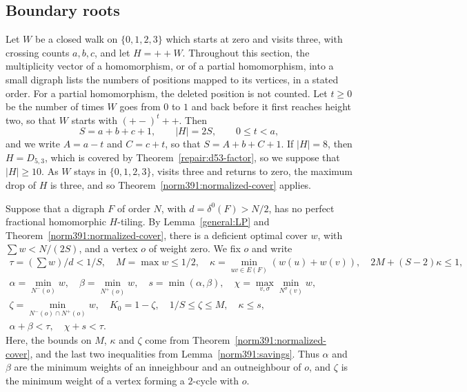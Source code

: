 \subsection{Boundary roots}
\label{boundary391:section}
Let $W$ be a closed walk on $\{0,1,2,3\}$ which starts at zero and visits
three, with crossing counts $a,b,c$, and let $H=++W$.
Throughout this section, the multiplicity vector of a homomorphism, or of a partial homomorphism, into a small digraph lists the numbers of positions mapped to its vertices, in a stated order. For a partial homomorphism, the deleted position is not counted.
Let $t\ge0$ be the number of times $W$ goes from $0$ to $1$ and back before it first reaches height two, so that $W$ starts with $(+-)^t++$. Then
\begin{equation}\label{tworoots:parameters}
 S=a+b+c+1,\qquad |H|=2S,\qquad 0\le t<a,
\end{equation}
and we write $A=a-t$ and $C=c+t$, so that $S=A+b+C+1$.
If $|H|=8$, then $H=D_{5,3}$, which is covered by Theorem~\ref{repair:d53-factor}, so we suppose that $|H|\ge10$. As $W$ stays in $\{0,1,2,3\}$, visits three and returns to zero, the maximum drop of $H$ is three, and so Theorem~\ref{norm391:normalized-cover} applies.

Suppose that a digraph $F$ of order $N$, with $d=\delta^0(F)>N/2$,
has no perfect fractional homomorphic $H$-tiling. By Lemma~\ref{general:LP} and Theorem~\ref{norm391:normalized-cover}, there is a deficient optimal cover $w$, with $\sum w<N/(2S)$, and a vertex $o$ of weight zero. We fix $o$ and write
\begin{equation}\label{shiftroot:boundary-setting}
\begin{gathered}
 \tau=(\sum w)/d<1/S,\quad M=\max w\le1/2,\quad
 \kappa=\min_{uv\in E(F)}(w(u)+w(v)),\quad
 2M+(S-2)\kappa\le1,\\
 \alpha=\min_{N^-(o)}w,\quad\beta=\min_{N^+(o)}w,
 \quad s=\min(\alpha,\beta),\quad
 \chi=\max_{v,\sigma}\min_{N^\sigma(v)}w,\\
 \zeta=\min_{N^-(o)\cap N^+(o)}w,\quad K_0=1-\zeta,
 \quad 1/S\le\zeta\le M,\quad\kappa\le s,\\
 \alpha+\beta<\tau,\quad\chi+s<\tau.
\end{gathered}
\end{equation}
Here, the bounds on $M$, $\kappa$ and $\zeta$ come from Theorem~\ref{norm391:normalized-cover}, and the last two inequalities from Lemma~\ref{norm391:savings}. Thus $\alpha$ and $\beta$ are the minimum weights of an inneighbour and an outneighbour of $o$, and $\zeta$ is the minimum weight of a vertex forming a $2$-cycle with $o$.

